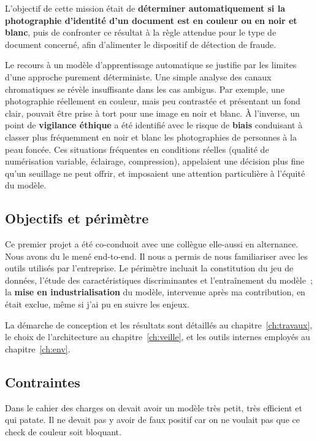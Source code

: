 L'objectif de cette mission était de \textbf{déterminer automatiquement si la
photographie d'identité d'un document est en couleur ou en noir et blanc}, puis de
confronter ce résultat à la règle attendue pour le type de document concerné, afin
d'alimenter le dispositif de détection de fraude.

Le recours à un modèle d'apprentissage automatique se justifie par les limites d'une
approche purement déterministe. Une simple analyse des canaux chromatiques se révèle
insuffisante dans les cas ambigus. Par exemple, une photographie réellement en couleur, mais peu
contrastée et présentant un fond clair, pouvait être prise à tort pour une image en
noir et blanc. À l'inverse, un point de \textbf{vigilance éthique} a été identifié avec
le risque de \textbf{biais} conduisant à classer plus fréquemment en noir et blanc
les photographies de personnes à la peau foncée. Ces situations fréquentes
en conditions réelles (qualité de numérisation variable, éclairage, compression),
appelaient une décision plus fine qu'un seuillage ne peut offrir, et imposaient une
attention particulière à l'équité du modèle.

\subsection{Objectifs et périmètre}

Ce premier projet a été co-conduoit avec une collègue elle-aussi en alternance. Nous avons du le mené end-to-end. Il nous a permis de nous familiariser avec les outils utilisés par l'entreprise. Le périmètre incluait la constitution du jeu de
données, l'étude des caractéristiques discriminantes et l'entraînement du modèle~;
la \textbf{mise en industrialisation} du modèle, intervenue après ma contribution, en
était exclue, même si j'ai pu en suivre les enjeux.

La démarche de conception et les résultats sont détaillés au
chapitre~\ref{ch:travaux}, le choix de l'architecture au chapitre~\ref{ch:veille}, et
les outils internes employés au chapitre~\ref{ch:env}.

\subsection{Contraintes}

Dans le cahier des charges on devait avoir un modèle très petit, très efficient et qui patate. Il ne devait pas y avoir de faux positif car on ne voulait pas que ce check de couleur soit bloquant.  

